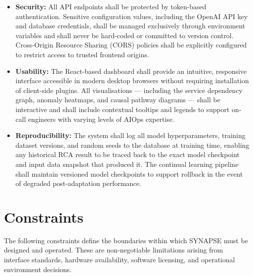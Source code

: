 \begin{itemize}
    \item \textbf{Security:} All API endpoints shall be protected by token-based authentication. Sensitive configuration values, including the OpenAI API key and database credentials, shall be managed exclusively through environment variables and shall never be hard-coded or committed to version control. Cross-Origin Resource Sharing (CORS) policies shall be explicitly configured to restrict access to trusted frontend origins.

    \item \textbf{Usability:} The React-based dashboard shall provide an intuitive, responsive interface accessible in modern desktop browsers without requiring installation of client-side plugins. All visualisations — including the service dependency graph, anomaly heatmaps, and causal pathway diagrams — shall be interactive and shall include contextual tooltips and legends to support on-call engineers with varying levels of AIOps expertise.

    \item \textbf{Reproducibility:} The system shall log all model hyperparameters, training dataset versions, and random seeds to the database at training time, enabling any historical RCA result to be traced back to the exact model checkpoint and input data snapshot that produced it. The continual learning pipeline shall maintain versioned model checkpoints to support rollback in the event of degraded post-adaptation performance.

\end{itemize}

\section{Constraints}

\hspace*{0.3in} The following constraints define the boundaries within which SYNAPSE must be designed and operated. These are non-negotiable limitations arising from interface standards, hardware availability, software licensing, and operational environment decisions.\\\\

